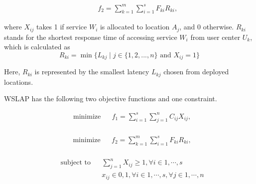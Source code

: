 \documentclass[10pt,journal,compsoc]{IEEEtran}
\begin{document}
\begin{equation} \label{eq:fit-latency}
\begin{aligned}
& & & f_2 = \sum\limits_{k=1}^m \sum\limits_{i=1}^s F_{ki} R_{ki},
\end{aligned}
\end{equation}
\normalsize


\noindent where $X_{ij}$ takes 1 if service $W_i$ is allocated to location $A_j$, and 0 otherwise. $R_{ki}$ stands for the shortest response time of accessing service $W_i$ from user center $U_k$, which is calculated as
\small
 \begin{equation}
 \label{eq:response}
  R_{ki} = \min\{L_{kj} \mid j \in \{1, 2, ..., n\} \text{ and } X_{ij} = 1\}
 \end{equation}
\normalsize

Here, $R_{ki}$ is represented by the smallest latency $L_{kj}$ chosen from deployed locations.

WSLAP has the following two objective functions and one constraint.

\small
\begin{equation} \label{eq:cost}
\begin{aligned}
& {\text{minimize}}
& &  f_1 = \sum\limits_{i=1}^s \sum\limits_{j = 1}^n C_{ij} X_{ij},\\
\end{aligned}
\end{equation}

\begin{equation}
\begin{aligned} \label{eq:latency}
& {\text{minimize}}
& & f_2 = \sum\limits_{k=1}^m \sum\limits_{i=1}^s F_{ki} R_{ki},\\
\end{aligned}
\end{equation}

\begin{equation} \label{eq:constraint}
\begin{aligned}
& \text{subject to}
& &  \sum_{j=1}^n X_{ij} \geqslant 1, \forall i \in {1, \cdots, s}\\
& & & x_{ij} \in {0, 1}, \forall i \in {1, \cdots, s}, \forall j \in {1, \cdots, n}
\end{aligned}
\end{equation}
\normalsize

\end{document}
